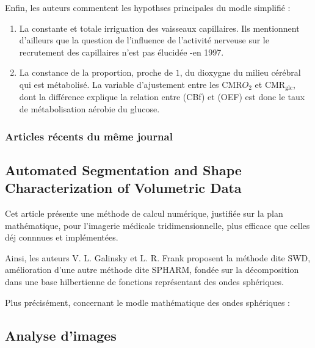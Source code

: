 \par
Enfin, les auteurs commentent les hypothses principales du modle simplifi\'e :
\begin{enumerate}
\item La constante et totale irriguation des vaisseaux capillaires. %
Ils mentionnent d'ailleurs que la question de l'influence de l'activit\'e nerveuse sur le recrutement des capillaires n'est pas \'elucid\'ee -en 1997.
\item La constance de la proportion, proche de $1$, du dioxygne du milieu c\'er\'ebral qui est m\'etabolis\'e. %
La variable d'ajustement entre les CMR$O_2$ et CMR${}_{\text{glc}}$, dont la diff\'erence explique la relation entre (CBf) et (OEF) est donc le taux de m\'etabolisation a\'erobie du glucose.
\end{enumerate}

\subsubsection{Articles r\'ecents du m\^eme journal}



\subsection{Automated Segmentation and Shape Characterization of Volumetric Data \cite{frsph}}

Cet article pr\'esente une m\'ethode de calcul num\'erique, justifi\'ee sur la plan math\'ematique, %
pour l'imagerie m\'edicale tridimensionnelle, plus efficace que celles d\'ej connnues et impl\'ement\'ees.

\par
Ainsi, les auteurs V. L. Galinsky et L. R. Frank proposent la m\'ethode dite SWD, am\'elioration d'une autre m\'ethode dite \og{} SPHARM\fg{}, %
fond\'ee sur la d\'ecomposition dans une base hilbertienne de fonctions  repr\'esentant des ondes sph\'eriques.

\ligneinter
Plus pr\'ecis\'ement, concernant le modle math\'ematique des ondes sph\'eriques :


\subsection{Analyse d'images}%

%

